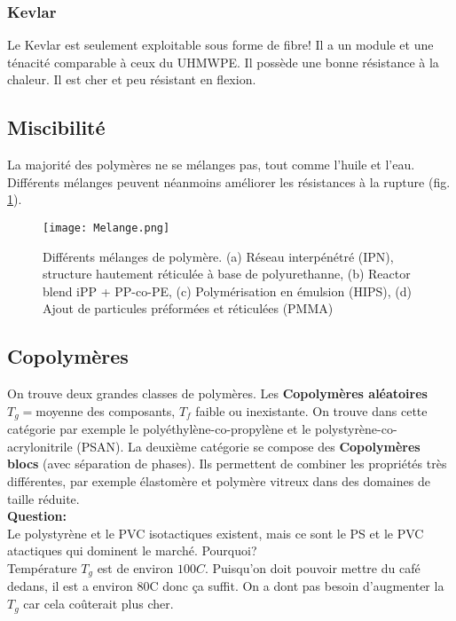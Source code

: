 \documentclass[../main.tex]{subfiles}
\begin{document}
	\subsubsection{Kevlar}
	Le Kevlar est seulement exploitable sous forme de fibre! Il a un module et une ténacité comparable à ceux du UHMWPE. Il possède une bonne résistance à la chaleur. Il est cher et peu résistant en flexion.
	\subsection{Miscibilité}
	La majorité des polymères ne se mélanges pas, tout comme l'huile et l'eau. Différents mélanges peuvent néanmoins améliorer les résistances à la rupture (fig. \ref{melange}).
	\begin{figure}
		\begin{center}
			\texttt{[image: Melange.png]}
			\caption{\label{melange}Différents mélanges de polymère. (a) Réseau interpénétré (IPN), structure hautement réticulée à base de polyurethanne, (b) Reactor blend iPP + PP-co-PE, (c) Polymérisation en émulsion (HIPS), (d) Ajout de particules préformées et réticulées (PMMA)}
		\end{center}
	\end{figure}
	\subsection{Copolymères}
	On trouve deux grandes classes de polymères.
	Les \textbf{Copolymères aléatoires} $T_g = $moyenne des composants, $T_f$ faible ou inexistante. On trouve dans cette catégorie par exemple le polyéthylène-co-propylène et le polystyrène-co-acrylonitrile (PSAN). La deuxième catégorie se compose des \textbf{Copolymères blocs} (avec séparation de phases). Ils permettent de combiner les propriétés très différentes, par exemple élastomère et polymère vitreux dans des domaines de taille réduite. 
	\\\textbf{Question:} \\Le polystyrène et le PVC isotactiques existent, mais ce sont le PS et le PVC atactiques qui dominent le marché. Pourquoi? \\ Température $T_g$ est de environ $100 C$. Puisqu'on doit pouvoir mettre du café dedans, il est a environ 80C donc ça suffit. On a dont pas besoin d'augmenter la $T_g$ car cela coûterait plus cher.
	
	 
\end{document}
